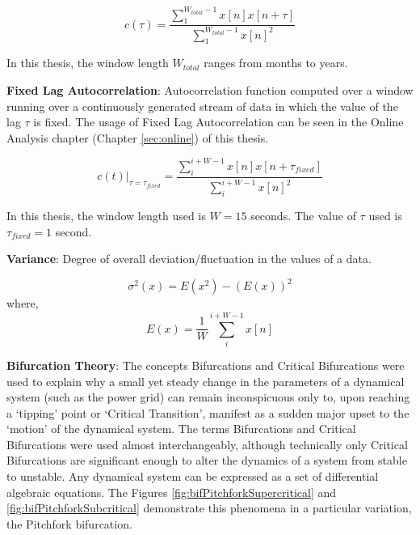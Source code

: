 \begin{equation}
	c(\tau) = \frac{\sum_{1}^{W_{total}-1} x[n]x[n+\tau]}{\sum_{1}^{W_{total}-1} x[n]^2} 
\end{equation}
 
 In this thesis, the window length $W_{total}$ ranges from months to years.
 
 \textbf{Fixed Lag Autocorrelation}: Autocorrelation function computed over a window running over a continuously generated stream of data in which the value of the lag $\tau$ is fixed. The usage of Fixed Lag Autocorrelation can be seen in the Online Analysis chapter (Chapter \ref{sec:online}) of this thesis.
 
 \begin{equation}
 	c(t)|_{\tau = \tau_{fixed}} = \frac{\sum_{i}^{i+W-1} x[n]x[n+\tau_{fixed}]}{\sum_{i}^{i+W-1} x[n]^2} 
 \end{equation}
 
 In this thesis, the window length used is $W=15$ seconds. The value of $\tau$ used is $\tau_{fixed}=1$ second.

\textbf{Variance}: Degree of overall deviation/fluctuation in the values of a data.

\begin{equation}
	\sigma^2(x) = E(x^2) - (E(x))^2 
\end{equation}
\hspace{75pt} where,
\begin{equation}
	E(x) = \frac{1}{W} \sum_{i}^{i+W-1} x[n]
\end{equation}

\textbf{Bifurcation Theory}: The concepts Bifurcations and Critical Bifurcations were used to explain why a small yet steady change in the parameters of a dynamical system (such as the power grid) can remain inconspicuous only to, upon reaching a `tipping' point or `Critical Transition', manifest as a sudden major upset to the `motion' of the dynamical system. The terms Bifurcations and Critical Bifurcations were used almost interchangeably, although technically only Critical Bifurcations are significant enough to alter the dynamics of a system from stable to unstable. Any dynamical system can be expressed as a set of differential algebraic equations. The  Figures \ref{fig:bifPitchforkSupercritical} and \ref{fig:bifPitchforkSubcritical} demonstrate this phenomena in a particular variation, the Pitchfork bifurcation.


